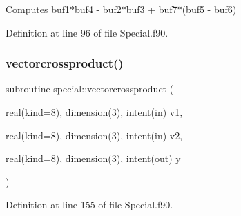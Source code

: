 Computes buf1$\ast$buf4 -\/ buf2$\ast$buf3 + buf7$\ast$(buf5 -\/ buf6) 



Definition at line 96 of file Special.\+f90.

\hypertarget{namespacespecial_af8feb44102816b409ca0b1d1ea8ae5cc}{}\label{namespacespecial_af8feb44102816b409ca0b1d1ea8ae5cc} 
\subsubsection{\texorpdfstring{vectorcrossproduct()}{vectorcrossproduct()}}
{\footnotesize\ttfamily subroutine special\+::vectorcrossproduct (\begin{DoxyParamCaption}\item[{real(kind=8), dimension(3), intent(in)}]{v1,  }\item[{real(kind=8), dimension(3), intent(in)}]{v2,  }\item[{real(kind=8), dimension(3), intent(out)}]{y }\end{DoxyParamCaption})}



Definition at line 155 of file Special.\+f90.

